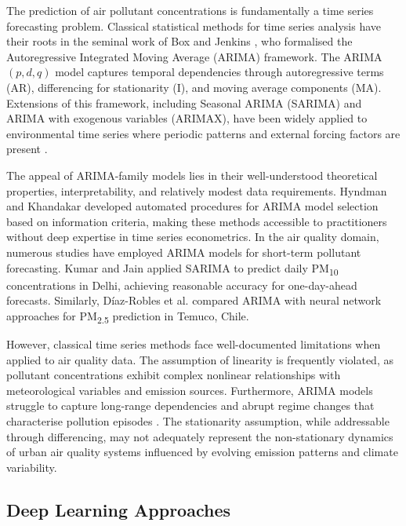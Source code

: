 The prediction of air pollutant concentrations is fundamentally a time series forecasting problem. Classical statistical methods for time series analysis have their roots in the seminal work of Box and Jenkins \cite{box1970timeseries}, who formalised the Autoregressive Integrated Moving Average (ARIMA) framework. The ARIMA$(p, d, q)$ model captures temporal dependencies through autoregressive terms (AR), differencing for stationarity (I), and moving average components (MA). Extensions of this framework, including Seasonal ARIMA (SARIMA) and ARIMA with exogenous variables (ARIMAX), have been widely applied to environmental time series where periodic patterns and external forcing factors are present \cite{hyndman2008forecasting}.

The appeal of ARIMA-family models lies in their well-understood theoretical properties, interpretability, and relatively modest data requirements. Hyndman and Khandakar \cite{hyndman2008forecasting} developed automated procedures for ARIMA model selection based on information criteria, making these methods accessible to practitioners without deep expertise in time series econometrics. In the air quality domain, numerous studies have employed ARIMA models for short-term pollutant forecasting. Kumar and Jain \cite{kumar2010arima} applied SARIMA to predict daily PM\textsubscript{10} concentrations in Delhi, achieving reasonable accuracy for one-day-ahead forecasts. Similarly, Díaz-Robles et al. \cite{diaz2008comparison} compared ARIMA with neural network approaches for PM\textsubscript{2.5} prediction in Temuco, Chile.

However, classical time series methods face well-documented limitations when applied to air quality data. The assumption of linearity is frequently violated, as pollutant concentrations exhibit complex nonlinear relationships with meteorological variables and emission sources. Furthermore, ARIMA models struggle to capture long-range dependencies and abrupt regime changes that characterise pollution episodes \cite{freeman2018forecasting}. The stationarity assumption, while addressable through differencing, may not adequately represent the non-stationary dynamics of urban air quality systems influenced by evolving emission patterns and climate variability.

\subsection{Deep Learning Approaches}
\label{subsec:deep_learning}

